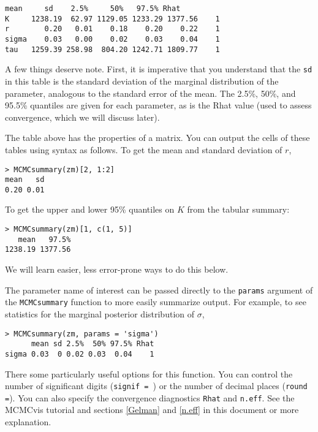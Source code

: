 \documentclass[12pt,english]{article}
\begin{document}
\begin{Verbatim}[fontsize=\small]
         mean     sd    2.5%     50%   97.5% Rhat
K     1238.19  62.97 1129.05 1233.29 1377.56    1
r        0.20   0.01    0.18    0.20    0.22    1
sigma    0.03   0.00    0.02    0.03    0.04    1
tau   1259.39 258.98  804.20 1242.71 1809.77    1
\end{Verbatim}

\noindent A few things deserve note. First, it is imperative that you understand that the \texttt{sd} in this table is the standard deviation of the marginal distribution of the parameter, analogous to the standard error of the mean. The 2.5\%, 50\%, and 95.5\% quantiles are given for each parameter, as is the Rhat value (used to assess convergence, which we will discuss later).

\noindent The table above has the properties of a matrix. You can output the cells of these tables using syntax as follows. To get the mean and standard deviation of $r$,

\begin{Verbatim}
> MCMCsummary(zm)[2, 1:2]
mean   sd 
0.20 0.01 
\end{Verbatim}

\noindent To get the upper and lower 95\% quantiles on $K$ from the tabular summary: 

\begin{Verbatim}
> MCMCsummary(zm)[1, c(1, 5)]
   mean   97.5% 
1238.19 1377.56
\end{Verbatim}
We will learn easier, less error-prone ways to do this below.

\noindent  The parameter name of interest can be passed directly to the \texttt{params} argument of the \texttt{MCMCsummary} function to more easily summarize output. For example, to see statistics for the marginal posterior distribution of $\sigma$,

\begin{Verbatim}
> MCMCsummary(zm, params = 'sigma')
      mean sd 2.5%  50% 97.5% Rhat
sigma 0.03  0 0.02 0.03  0.04    1
\end{Verbatim}

There some particularly useful options for this function.  You can control the number of significant digits (\texttt{signif = }) or the number of decimal places (\texttt{round =}).  You can also specify the convergence diagnostics \texttt{Rhat} and \texttt{n.eff}.  See the MCMCvis tutorial and sections \ref{Gelman} and \ref{n.eff}  in this document or more explanation.
\end{document}
